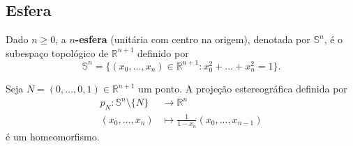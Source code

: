 \subsection{Esfera}
\label{esfera-def}

\begin{defi}
     Dado $n\geq 0$, a \textbf{$n$-esfera} (unitária com centro na origem), denotada por $\mathbb{S}^n$, é o subespaço topológico de $\mathbb{R}^{n+1}$ definido por 
     \[\mathbb{S}^n=\{(x_0,...,x_n)\in \mathbb{R}^{n+1}:x_0^2+...+x_n^2=1\}.\]
\end{defi}

\begin{prop}
    Seja $N=(0,...,0,1)\in \mathbb{R}^{n+1}$ um ponto. A projeção estereográfica definida por 
    \begin{align*}
        p_N:\mathbb{S}^n\setminus \{N\}&\longrightarrow \mathbb{R}^n\\
        (x_0,...,x_n)&\longmapsto \frac{1}{1-x_n}(x_0,...,x_{n-1})
    \end{align*}
    é um homeomorfismo.
\end{prop}

